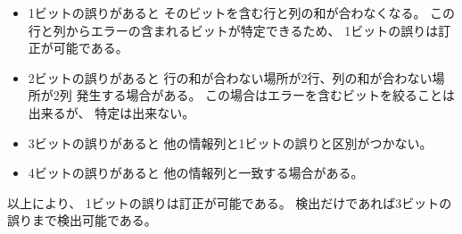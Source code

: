 \documentclass[12pt,b5paper]{ltjsarticle}
\begin{document}
\dotfill


\begin{itemize}
 \item
      1ビットの誤りがあると
      そのビットを含む行と列の和が合わなくなる。
      この行と列からエラーの含まれるビットが特定できるため、
      1ビットの誤りは訂正が可能である。

 \item
      2ビットの誤りがあると
      行の和が合わない場所が2行、列の和が合わない場所が2列
      発生する場合がある。
      この場合はエラーを含むビットを絞ることは出来るが、
      特定は出来ない。

 \item
      3ビットの誤りがあると
      他の情報列と1ビットの誤りと区別がつかない。

 \item
      4ビットの誤りがあると
      他の情報列と一致する場合がある。
\end{itemize}

以上により、
1ビットの誤りは訂正が可能である。
検出だけであれば3ビットの誤りまで検出可能である。
\end{document}
